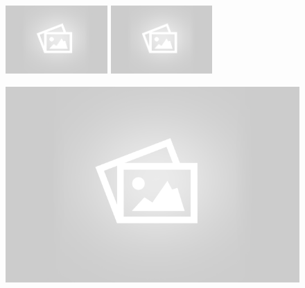 \makeatletter
\begin{titlepage}
\begin{center}
\begin{figure}[!ht]
	\includegraphics[height=7em]{images/placeholder}
	\hfill
	\includegraphics[height=7em]{images/placeholder}
\end{figure}

\vfill
{ \huge \bfseries \@title }

\begin{figure}[!ht]
	\includegraphics[width=\linewidth]{images/placeholder}
\end{figure}

\vfill

\noindent

\begin{flushright}
{\it \@author}
\end{flushright}

\vfill

\@date

\end{center}
\end{titlepage}
\makeatother


